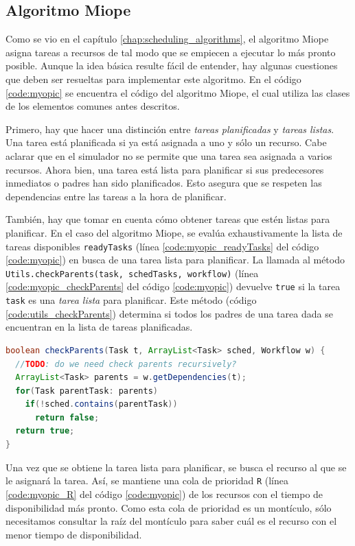 \subsection{Algoritmo Miope}
Como se vio en el capítulo \ref{chap:scheduling_algorithms}, el algoritmo Miope asigna tareas a recursos de tal modo que se empiecen a ejecutar lo más pronto posible. Aunque la idea básica resulte fácil de entender, hay algunas cuestiones que deben ser resueltas para implementar este algoritmo. En el código \ref{code:myopic} se encuentra el código del algoritmo Miope, el cual utiliza las clases de los elementos comunes antes descritos. 

Primero, hay que hacer una distinción entre \emph{tareas planificadas} y \emph{tareas listas}. Una tarea está planificada si ya está asignada a uno y sólo un recurso. Cabe aclarar que en el simulador no se permite que una tarea sea asignada a varios recursos. Ahora bien, una tarea está lista para planificar si sus predecesores inmediatos o padres han sido planificados. Esto asegura que se respeten las dependencias entre las tareas a la hora de planificar.

También, hay que tomar en cuenta cómo obtener tareas que estén listas para planificar. En el caso del algoritmo Miope, se evalúa exhaustivamente la lista de tareas disponibles \texttt{readyTasks} (línea \ref{code:myopic_readyTasks} del código \ref{code:myopic}) en busca de una tarea lista para planificar. La llamada al método \texttt{Utils.checkParents(task, schedTasks, workflow)} (línea \ref{code:myopic_checkParents} del código \ref{code:myopic}) devuelve \texttt{true} si la tarea \texttt{task} es una \emph{tarea lista} para planificar. Este método (código \ref{code:utils_checkParents}) determina si todos los padres de una tarea dada se encuentran en la lista de tareas planificadas.

\begin{lstlisting}[language=java,label={code:utils_checkParents},caption={Método que verifica si los padres de una tarea están planificados.},float]
boolean checkParents(Task t, ArrayList<Task> sched, Workflow w) {
  //TODO: do we need check parents recursively?
  ArrayList<Task> parents = w.getDependencies(t);
  for(Task parentTask: parents)
    if(!sched.contains(parentTask))
      return false;
  return true;
}
\end{lstlisting}

Una vez que se obtiene la tarea lista para planificar, se busca el recurso al que se le asignará la tarea. Así, se mantiene una cola de prioridad \texttt{R} (línea \ref{code:myopic_R} del código \ref{code:myopic}) de los recursos con el tiempo de disponibilidad más pronto. Como esta cola de prioridad es un montículo, sólo necesitamos consultar la raíz del montículo para saber cuál es el recurso con el menor tiempo de disponibilidad.


